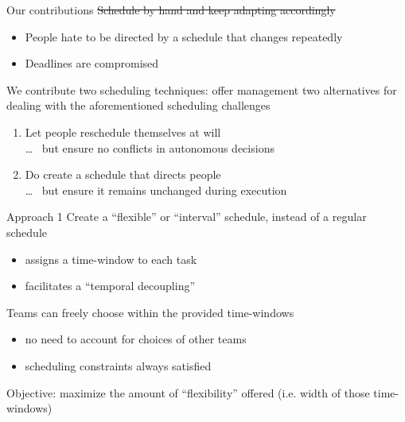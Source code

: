 \begin{frame}{Our contributions}
	\st{Schedule by hand and keep adapting accordingly}
	\begin{itemize}
		\item People hate to be directed by a schedule that changes repeatedly 
		\item Deadlines are compromised
	\end{itemize}

	\bigskip

	We contribute two scheduling techniques:
	offer management two alternatives for dealing with the aforementioned scheduling challenges
	\begin{enumerate}
		\item Let people reschedule themselves at will \\
			\ldots ~ but ensure no conflicts in autonomous decisions

		\item Do create a schedule that directs people \\
			\ldots ~ but ensure it remains unchanged during execution
	\end{enumerate}
\end{frame}

\begin{frame}{Approach 1}
	Create a ``flexible'' or ``interval'' schedule, instead of a regular schedule
	\begin{itemize}
		\item assigns a time-window to each task
		\item facilitates a ``temporal decoupling''
	\end{itemize}

	\pause
	\medskip

	Teams can freely choose within the provided time-windows 
	\begin{itemize}
		\item no need to account for choices of other teams
		\item scheduling constraints always satisfied
	\end{itemize}
	

	\medskip

	Objective: maximize the amount of ``flexibility'' offered (i.e. width of those time-windows)
\end{frame}

